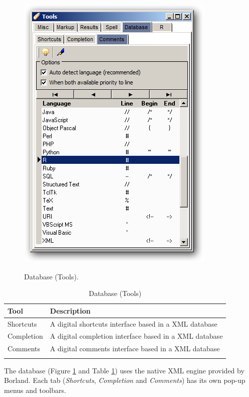 \begin{figure}[h!]
  \includegraphics[scale=0.35]{./res/tools_database_comments.png}\\
  \caption{Database (Tools).}
  \label{fig:tools_database}
\end{figure}

\begin{table}
  \begin{footnotesize}
    \begin{tabularx}{\textwidth}{>{\hsize=0.3\hsize}X>{\hsize=0.7\hsize}X}\\
      \hline
      \textbf{Tool} & \textbf{Description} \\
      \hline
      Shortcuts & A digital shortcuts interface based in a XML database \\
      Completion & A digital completion interface based in a XML database \\
      Comments & A digital comments interface based in a XML database \\
      \hline
      \\
    \end{tabularx}
  \end{footnotesize}
  \caption{Database (Tools)}
  \label{tab:tools_database}
\end{table}


The database
(Figure \ref{fig:tools_database} and
Table \ref{tab:tools_database})
uses the native XML engine provided by Borland. Each tab
(\textit{Shortcuts}, \textit{Completion} and
\textit{Comments}) has its own pop-up menus and toolbars.


